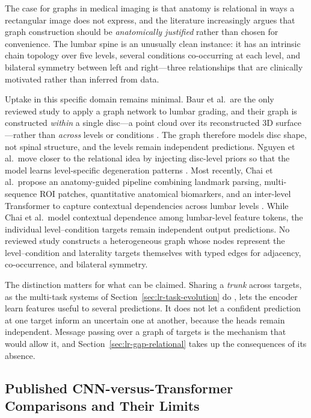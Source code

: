 The case for graphs in medical imaging is that anatomy is relational in ways a
rectangular image does not express, and the literature increasingly argues that
graph construction should be \emph{anatomically justified} rather than chosen for
convenience. The lumbar spine is an unusually clean instance: it has an
intrinsic chain topology over five levels, several conditions co-occurring at
each level, and bilateral symmetry between left and right---three relationships
that are clinically motivated rather than inferred from data.

Uptake in this specific domain remains minimal. Baur et al.\ are the only
reviewed study to apply a graph network to lumbar grading, and their graph is
constructed \emph{within} a single disc---a point cloud over its reconstructed
3D surface---rather than \emph{across} levels or conditions
\cite{baur2024automated}. The graph therefore models disc shape, not spinal
structure, and the levels remain independent predictions. Nguyen et al.\ move
closer to the relational idea by injecting disc-level priors so that the model
learns level-specific degeneration patterns \cite{nguyen2026crossspine}.
Most recently, Chai et al.\ propose an anatomy-guided pipeline combining landmark
parsing, multi-sequence ROI patches, quantitative anatomical biomarkers, and an
inter-level Transformer to capture contextual dependencies across lumbar levels
\cite{chai2026anatomy}. While Chai et al.\ model contextual dependence among
lumbar-level feature tokens, the individual level--condition targets remain
independent output predictions. No reviewed study constructs a heterogeneous graph
whose nodes represent the level--condition and laterality targets themselves with
typed edges for adjacency, co-occurrence, and bilateral symmetry.

The distinction matters for what can be claimed. Sharing a \emph{trunk} across
targets, as the multi-task systems of Section~\ref{sec:lr-task-evolution} do
\cite{jamaludin2017spinenet,su2022automatic}, lets the encoder learn features
useful to several predictions. It does not let a confident prediction at one
target inform an uncertain one at another, because the heads remain independent.
Message passing over a graph of targets is the mechanism that would allow it,
and Section~\ref{sec:lr-gap-relational} takes up the consequences of its
absence.

\subsection{Published CNN-versus-Transformer Comparisons and Their Limits}
\label{sec:lr-cnn-vs-transformer}

